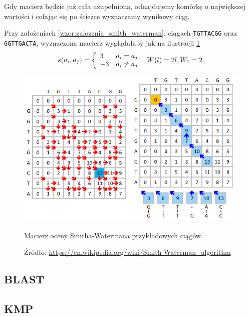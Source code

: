 Gdy macierz będzie już cała uzupełniona, odnajdujemy komórkę o największej wartości i cofając się po ścieżce wyznaczamy wynikowy ciąg.

Przy założeniach \ref{wzor:zalozenia_smith_waterman}, ciągach \verb|TGTTACGG| oraz \verb|GGTTGACTA|, wyznaczona macierz wyglądałaby jak na ilustracji \ref{img:Smith-Waterman-kroki-2-3}
\begin{equation}
\label{wzor:zalozenia_smith_waterman}
s(a_i,a_j) =\left\{ 
	\begin{array}{ll}
	3 & \textrm{$a_i = a_j$}\\
	-3 & \textrm{$a_i \ne a_j$}\\
\end{array}\\
\right.\\
{\phantom{1}}
W(l) = 2l, W_1 = 2
\end{equation}

\begin{figure}[h]
	\centering
	\includegraphics[width=1\textwidth]{img/Smith-Waterman-Algorithm-Example-Step2-and-3.png}
	\caption{Macierz oceny Smitha-Watermana przykładowych ciągów.}
	\label{img:Smith-Waterman-kroki-2-3}
	\vspace{-0.5cm}
	\caption*{\scriptsize Źródło: 
		\url{https://en.wikipedia.org/wiki/Smith-Waterman\_algorithm}
	}
\end{figure}

\subsection*{BLAST}

\subsection*{KMP}

